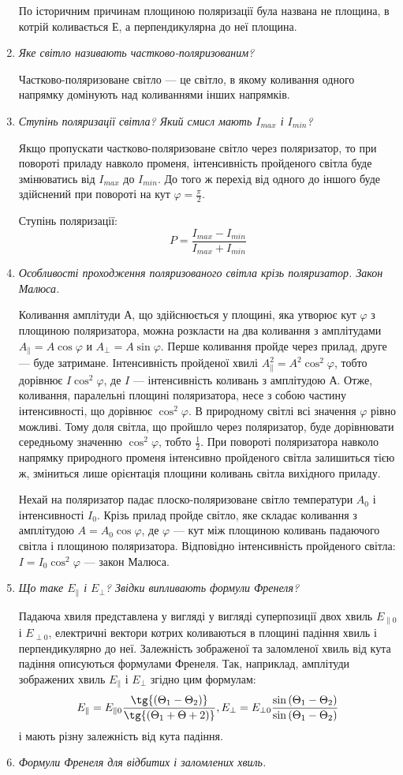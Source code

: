 \documentclass[a4paper,10pt,notitlepage,pdftex,headsepline]{scrartcl}
\begin{document}
\begin{enumerate}
По історичним причинам площиною поляризації була названа не площина, в котрій коливається $Е$, а перпендикулярна до неї площина.
\item \textit{Яке світло називають частково-поляризованим?}

Частково-поляризоване світло --- це світло, в якому коливання одного напрямку домінують над коливаннями інших напрямків.
\item \textit{Ступінь поляризації світла? Який смисл мають $I_{max}$ і $I_{min}$?}

Якщо пропускати частково-поляризоване світло через поляризатор, то при повороті приладу навколо променя, інтенсивність пройденого світла буде змінюватись від $I_{max}$ до $I_{min}$.
До того ж перехід від одного до іншого буде здійснений при повороті на кут $\varphi = \frac{\pi}{2}$.

Ступінь поляризації:
$$P = \frac{I_{max} - I_{min}}{I_{max} + I_{min}}$$
\item \textit{Особливості проходження поляризованого світла крізь поляризатор. Закон Малюса.}

Коливання амплітуди $А$, що здійснюється у площині, яка утворює кут $\varphi$ з площиною поляризатора, можна розкласти на два коливання з амплітудами $A_\parallel = A\cos\varphi$ и $A_\perp = A\sin\varphi$.
Перше коливання пройде через прилад, друге --- буде затримане.
Інтенсивність пройденої хвилі $A_\parallel^2=A^2\cos^2\varphi$, тобто дорівнює
$I\cos^2\varphi$, де $I$ --- інтенсивність коливань з амплітудою $А$.
Отже, коливання, паралельні площині поляризатора, несе з собою частину інтенсивності, що дорівнює $\cos^2\varphi$.
В природному світлі всі значення $\varphi$ рівно можливі.
Тому доля світла, що пройшло через поляризатор, буде дорівнювати середньому значенню $\cos^2\varphi$, тобто $\frac12$.
При повороті поляризатора навколо напрямку природного променя інтенсивно пройденого світла залишиться тією ж, зміниться лише орієнтація площини коливань світла вихідного приладу.

Нехай на поляризатор падає плоско-поляризоване світло температури $A_0$ і інтенсивності $I_0$.
Крізь прилад пройде світло, яке складає коливання з амплітудою $A = A_0 \cos\varphi$, де $\varphi$ --- кут між площиною коливань падаючого світла і площиною поляризатора.
Відповідно інтенсивність пройденого світла: $I = I_0\cos^2\varphi$ --- закон Малюса.
\item \textit{Що таке $E_\parallel$ і $E_\perp$? Звідки випливають формули Френеля?}

Падаюча хвиля представлена у вигляді у вигляді суперпозиції двох хвиль $E_{\parallel 0}$ і $E_{\perp 0}$, електричні вектори котрих коливаються в площині падіння хвиль і перпендикулярно до неї.
Залежність зображеної та заломленої хвиль від кута падіння описуються формулами Френеля.
Так, наприклад, амплітуди зображених хвиль $E_\parallel$ і $E_\perp$ згідно цим формулам:
$$E_\parallel = E_{\parallel 0} \frac{\tg{\left(\Theta_1 - \Theta_2\right)}}{\tg{\left(\Theta_1 + \Theta+2\right)}}, E_\perp = E_{\perp 0}\frac{\sin{\left(\Theta_1 - \Theta_2\right)}}{\sin{\left(\Theta_1 - \Theta_2\right)}}$$
і мають різну залежність від кута падіння.
\item \textit{Формули Френеля для відбитих і заломлених хвиль.}


\end{enumerate}
\end{document}
